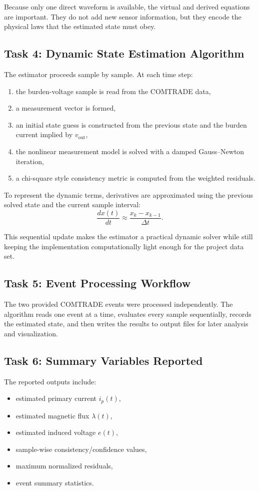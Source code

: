 \documentclass[11pt]{article}
\begin{document}
Because only one direct waveform is available, the virtual and derived equations are important.
They do not add new sensor information, but they encode the physical laws that the estimated state
must obey.

\subsection{Task 4: Dynamic State Estimation Algorithm}
The estimator proceeds sample by sample. At each time step:
\begin{enumerate}
  \item the burden-voltage sample is read from the COMTRADE data,
  \item a measurement vector is formed,
  \item an initial state guess is constructed from the previous state and the burden current
  implied by $v_{\text{out}}$,
  \item the nonlinear measurement model is solved with a damped Gauss--Newton iteration,
  \item a chi-square style consistency metric is computed from the weighted residuals.
\end{enumerate}

To represent the dynamic terms, derivatives are approximated using the previous solved state and
the current sample interval:
\begin{equation}
\frac{d x(t)}{dt} \approx \frac{x_k - x_{k-1}}{\Delta t}.
\end{equation}

This sequential update makes the estimator a practical dynamic solver while still keeping the
implementation computationally light enough for the project data set.

\subsection{Task 5: Event Processing Workflow}
The two provided COMTRADE events were processed independently. The algorithm reads one event at a
time, evaluates every sample sequentially, records the estimated state, and then writes the
results to output files for later analysis and visualization.

\subsection{Task 6: Summary Variables Reported}
The reported outputs include:
\begin{itemize}
  \item estimated primary current $i_p(t)$,
  \item estimated magnetic flux $\lambda(t)$,
  \item estimated induced voltage $e(t)$,
  \item sample-wise consistency/confidence values,
  \item maximum normalized residuals,
  \item event summary statistics.
\end{itemize}
\end{document}
